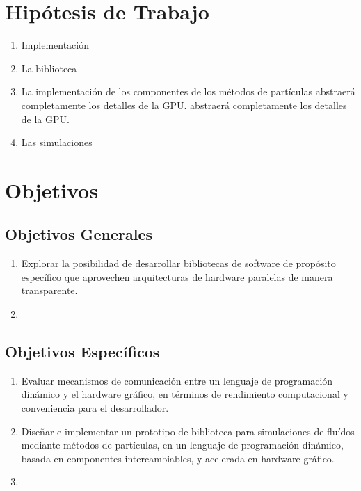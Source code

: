 \documentclass[11pt,spanish]{article}
\begin{document}
\newpage
\section{Hipótesis de Trabajo}
\begin{enumerate}
    \item Implementación
    \item La biblioteca
    \item La implementación de los componentes de los métodos de partículas abstraerá completamente los detalles de la GPU.
        abstraerá completamente los detalles de la GPU.
    \item Las simulaciones 
\end{enumerate}

\newpage
\section{Objetivos }

\subsection{Objetivos Generales}

\begin{enumerate}
    \item Explorar la posibilidad de desarrollar bibliotecas de software de
        propósito específico que aprovechen arquitecturas de hardware paralelas
        de manera transparente.
    \item 
\end{enumerate}

\subsection{Objetivos Específicos}

\begin{enumerate}
   \item Evaluar mecanismos de comunicación entre un lenguaje de programación
       dinámico y el hardware gráfico, en términos de rendimiento computacional y
       conveniencia para el desarrollador.
   \item Diseñar e implementar un prototipo de biblioteca
       para simulaciones de fluídos mediante métodos de partículas,
       en un lenguaje de programación dinámico,
       basada en componentes intercambiables,
       y acelerada en hardware gráfico.
   \item 
\end{enumerate}
\end{document}
